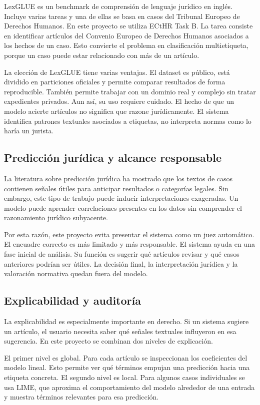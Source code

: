 \documentclass[11pt,a4paper]{article}
\begin{document}
LexGLUE es un benchmark de comprensión de lenguaje jurídico en inglés. Incluye varias tareas y una de ellas se basa en casos del Tribunal Europeo de Derechos Humanos. En este proyecto se utiliza ECtHR Task B. La tarea consiste en identificar artículos del Convenio Europeo de Derechos Humanos asociados a los hechos de un caso. Esto convierte el problema en clasificación multietiqueta, porque un caso puede estar relacionado con más de un artículo.

La elección de LexGLUE tiene varias ventajas. El dataset es público, está dividido en particiones oficiales y permite comparar resultados de forma reproducible. También permite trabajar con un dominio real y complejo sin tratar expedientes privados. Aun así, su uso requiere cuidado. El hecho de que un modelo acierte artículos no significa que razone jurídicamente. El sistema identifica patrones textuales asociados a etiquetas, no interpreta normas como lo haría un jurista.

\subsection{Predicción jurídica y alcance responsable}

La literatura sobre predicción jurídica ha mostrado que los textos de casos contienen señales útiles para anticipar resultados o categorías legales. Sin embargo, este tipo de trabajo puede inducir interpretaciones exageradas. Un modelo puede aprender correlaciones presentes en los datos sin comprender el razonamiento jurídico subyacente.

Por esta razón, este proyecto evita presentar el sistema como un juez automático. El encuadre correcto es más limitado y más responsable. El sistema ayuda en una fase inicial de análisis. Su función es sugerir qué artículos revisar y qué casos anteriores podrían ser útiles. La decisión final, la interpretación jurídica y la valoración normativa quedan fuera del modelo.

\subsection{Explicabilidad y auditoría}

La explicabilidad es especialmente importante en derecho. Si un sistema sugiere un artículo, el usuario necesita saber qué señales textuales influyeron en esa sugerencia. En este proyecto se combinan dos niveles de explicación.

El primer nivel es global. Para cada artículo se inspeccionan los coeficientes del modelo lineal. Esto permite ver qué términos empujan una predicción hacia una etiqueta concreta. El segundo nivel es local. Para algunos casos individuales se usa LIME, que aproxima el comportamiento del modelo alrededor de una entrada y muestra términos relevantes para esa predicción.
\end{document}
